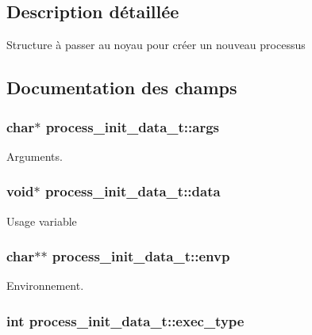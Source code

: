 \subsection{\-Description détaillée}
\-Structure à passer au noyau pour créer un nouveau processus 

\subsection{\-Documentation des champs}
\hypertarget{structprocess__init__data__t_a16d011771835f06e0bb3d5fd6115e13c}{
\subsubsection[{args}]{\setlength{\rightskip}{0pt plus 5cm}char$\ast$ {\bf process\-\_\-init\-\_\-data\-\_\-t\-::args}}}\label{structprocess__init__data__t_a16d011771835f06e0bb3d5fd6115e13c}
\-Arguments. \hypertarget{structprocess__init__data__t_ae950cc2a2cc04d1c00a71f70c2fde72c}{
\subsubsection[{data}]{\setlength{\rightskip}{0pt plus 5cm}void$\ast$ {\bf process\-\_\-init\-\_\-data\-\_\-t\-::data}}}\label{structprocess__init__data__t_ae950cc2a2cc04d1c00a71f70c2fde72c}
\-Usage variable \hypertarget{structprocess__init__data__t_a863d82fbd718f53164a520f67376eac2}{
\subsubsection[{envp}]{\setlength{\rightskip}{0pt plus 5cm}char$\ast$$\ast$ {\bf process\-\_\-init\-\_\-data\-\_\-t\-::envp}}}\label{structprocess__init__data__t_a863d82fbd718f53164a520f67376eac2}
\-Environnement. \hypertarget{structprocess__init__data__t_a1cda790f7d2446a04562094f09e358ab}{
\subsubsection[{exec\-\_\-type}]{\setlength{\rightskip}{0pt plus 5cm}int {\bf process\-\_\-init\-\_\-data\-\_\-t\-::exec\-\_\-type}}}\label{structprocess__init__data__t_a1cda790f7d2446a04562094f09e358ab}
